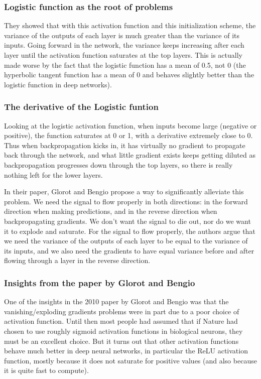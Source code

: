 \documentclass{beamer}
\begin{document}
\begin{frame}
\frametitle{Logistic function as the root of problems}

They showed that with this activation function and this
initialization scheme, the variance of the outputs of each layer is
much greater than the variance of its inputs. Going forward in the
network, the variance keeps increasing after each layer until the
activation function saturates at the top layers. This is actually made
worse by the fact that the logistic function has a mean of 0.5, not 0
(the hyperbolic tangent function has a mean of 0 and behaves slightly
better than the logistic function in deep networks).
\end{frame}

\begin{frame}
\frametitle{The derivative of the Logistic funtion}

Looking at the logistic activation function, when inputs become large
(negative or positive), the function saturates at 0 or 1, with a
derivative extremely close to 0. Thus when backpropagation kicks in,
it has virtually no gradient to propagate back through the network,
and what little gradient exists keeps getting diluted as
backpropagation progresses down through the top layers, so there is
really nothing left for the lower layers.

In their paper, Glorot and Bengio propose a way to significantly
alleviate this problem. We need the signal to flow properly in both
directions: in the forward direction when making predictions, and in
the reverse direction when backpropagating gradients. We don’t want
the signal to die out, nor do we want it to explode and saturate. For
the signal to flow properly, the authors argue that we need the
variance of the outputs of each layer to be equal to the variance of
its inputs, and we also need the gradients to have equal variance
before and after flowing through a layer in the reverse direction.
\end{frame}

\begin{frame}
\frametitle{Insights from the paper by Glorot and Bengio}

One of the insights in the 2010 paper by Glorot and Bengio was that
the vanishing/exploding gradients problems were in part due to a poor
choice of activation function. Until then most people had assumed that
if Nature had chosen to use roughly sigmoid activation functions in
biological neurons, they must be an excellent choice. But it turns out
that other activation functions behave much better in deep neural
networks, in particular the ReLU activation function, mostly because
it does not saturate for positive values (and also because it is quite
fast to compute).
\end{frame}
\end{document}

